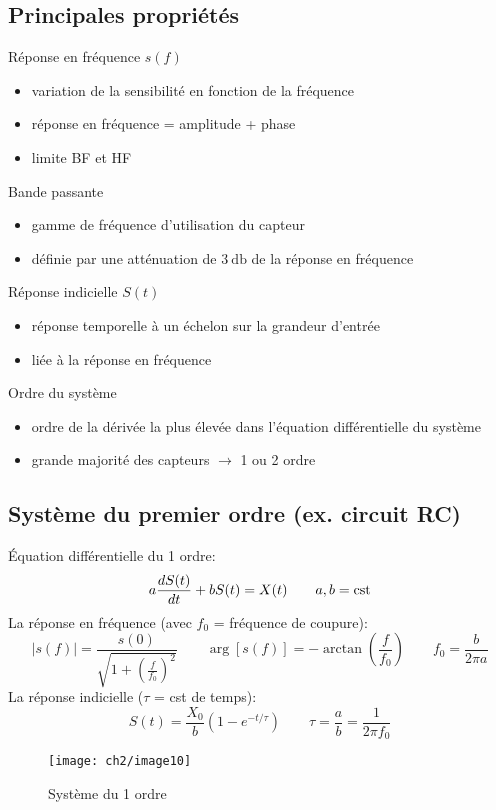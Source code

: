 \subsection{Principales propriétés}
\begin{description}
	\item Réponse en fréquence \(s(f)\)
	\begin{itemize}
		\item variation de la sensibilité en fonction de la fréquence
		\item réponse en fréquence = amplitude + phase
		\item limite BF et HF
	\end{itemize}
	\item Bande passante
	\begin{itemize}
		\item gamme de fréquence d'utilisation du capteur
		\item définie par une atténuation de \(\SI{3}{\decibel}\) de la réponse en fréquence
	\end{itemize}
	\item Réponse indicielle \(S(t)\)
	\begin{itemize}
		\item réponse temporelle à un échelon sur la grandeur d'entrée
		\item liée à la réponse en fréquence
	\end{itemize}
	\item Ordre du système
	\begin{itemize}
		\item ordre de la dérivée la plus élevée dans l'équation différentielle du système
		\item grande majorité des capteurs \(\rightarrow\) 1 ou 2 ordre
	\end{itemize}
\end{description}
\subsection{Système du premier ordre (ex. circuit RC)}
Équation différentielle du 1 ordre:
\[
a\frac{d S(t)}{dt} + b S(t) = X(t)\qquad a, b=\text{cst}
\]
La réponse en fréquence (avec \(f_0\) = fréquence de coupure):
\[
|s(f)|=\frac{s(0)}{\sqrt{1+\left(\frac{f}{f_0}\right)^2}}\qquad \arg[s(f)] = -\arctan\left(\frac{f}{f_0}\right)\qquad f_0=\frac{b}{2\pi a}
\]
La réponse indicielle (\(\tau\) = cst de temps):
\[
S(t) = \frac{X_0}{b}\left(1-e^{-t/\tau}\right)\qquad \tau =\frac{a}{b}=\frac{1}{2\pi f_0}
\]
\begin{figure}[H] 
	\centering 
	\texttt{[image: ch2/image10]} 
	\caption{Système du 1 ordre} 
\end{figure}
